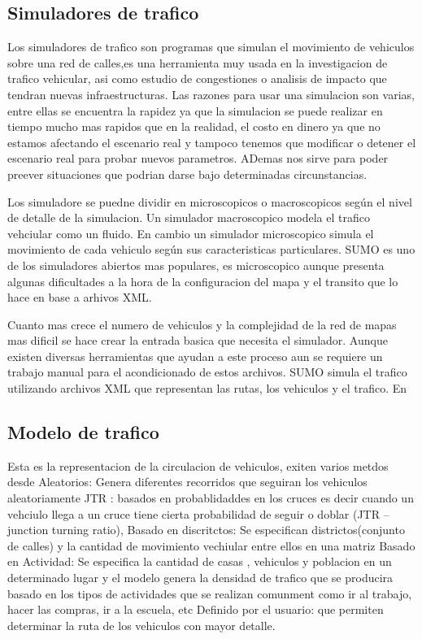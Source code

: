 \subsection{Simuladores de trafico}
Los simuladores de trafico son programas que simulan el movimiento de vehiculos sobre una red de calles,es una herramienta muy usada en la investigacion de trafico vehicular, asi como estudio de congestiones o analisis de impacto que tendran nuevas infraestructuras.  Las razones para usar una simulacion son varias, entre ellas se encuentra  la rapidez  ya que la simulacion se puede realizar en tiempo mucho mas rapidos que en la realidad, el costo en dinero ya que no estamos afectando el escenario real  y tampoco tenemos que modificar o detener el escenario real para probar nuevos parametros. ADemas nos sirve para poder preever situaciones que podrian darse bajo determinadas circunstancias.

Los simuladore se puedne dividir en microscopicos o macroscopicos según el nivel de detalle de la simulacion. Un simulador macroscopico modela  el trafico vehciular como un fluido. En cambio un simulador microscopico simula el movimiento de cada vehiculo según sus caracteristicas particulares.
SUMO es uno de los simuladores abiertos mas populares,  es microscopico aunque presenta algunas dificultades a la hora de la configuracion del mapa y el transito que lo hace en base a arhivos XML.

Cuanto mas crece el numero de vehiculos y la complejidad de la red de mapas mas dificil se hace crear la entrada basica que necesita el simulador. Aunque existen diversas herramientas que ayudan a este proceso aun se requiere un trabajo manual para el acondicionado de estos archivos.
SUMO simula el trafico utilizando archivos XML que representan las rutas, los vehiculos y el trafico. En 

\subsection{Modelo de trafico }
Esta es la representacion de la circulacion de vehiculos, exiten varios metdos desde 
Aleatorios: Genera diferentes recorridos que seguiran los vehiculos aleatoriamente
JTR : basados en probablidaddes en los cruces  es decir cuando un vehciulo llega a un cruce tiene cierta probabilidad de seguir o doblar (JTR – junction turning ratio), 
Basado en discritctos:  Se especifican districtos(conjunto de calles) y  la cantidad de movimiento vechiular entre ellos en una  matriz
Basado en Actividad: Se especifica la cantidad de casas , vehiculos y poblacion en un determinado lugar y el modelo genera la densidad de trafico que se producira basado en los tipos de actividades que se realizan comunment como ir al trabajo, hacer las compras, ir a la escuela,  etc
Definido por el usuario: que permiten determinar la ruta de los vehiculos con mayor detalle.

